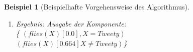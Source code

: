 \documentclass[a4paper, 11pt]{book}
\newtheorem{Bsp}{Beispiel}[section]
\begin{document}
{\begin{Bsp}[Beispielhafte Vorgehensweise des Algorithmus]
\begin{enumerate}
\begin{quote}
			
			Positive Generalisierung:\\  
			$ (flies(X)[0.0], X=Tweety) $\\
			$ (flies(X)[0.664], X=Bully \lor  X=Sylvester \lor X=Kirby)) $\\
			Negative Generalisierung:\\  
			$ (flies(X)[0.0], X=Tweety) $\\
			$ (flies(X)[0.664] X \neq Tweety) $\\
			Logische Minimierung des Constraints\\
			Vergleich der Generalisierungen und Wahl derjenigen mit dem kürzeren Constraint\\
		\end{quote}
	\item Ergebnis: Ausgabe der Komponente:\\
	\{ $ (flies(X)[0.0], X=Tweety) $\\
	$ (flies(X)[0.664] X \neq Tweety) $\}
	
	\end{enumerate}
	
\end{Bsp}

}
\end{document}
